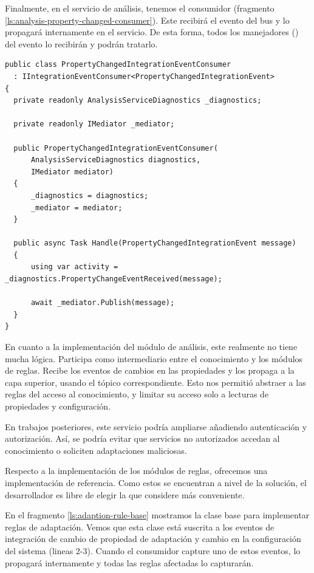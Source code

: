 Finalmente, en el servicio de análisis, tenemos el consumidor (fragmento \ref{ls:analysis-property-changed-consumer}). Este recibirá el evento del bus y lo propagará internamente en el servicio. De esta forma, todos los manejadores () del evento lo recibirán y podrán tratarlo.

\begin{lstlisting}[language={[Sharp]C},caption={El consumidor recibe el evento de integración del bus y lo propaga internamente. Todos los manejadores de este evento lo recibirán.},captionpos=b, label=ls:analysis-property-changed-consumer]
public class PropertyChangedIntegrationEventConsumer
  : IIntegrationEventConsumer<PropertyChangedIntegrationEvent>
{
  private readonly AnalysisServiceDiagnostics _diagnostics;

  private readonly IMediator _mediator;

  public PropertyChangedIntegrationEventConsumer(
      AnalysisServiceDiagnostics diagnostics,
      IMediator mediator)
  {
      _diagnostics = diagnostics;
      _mediator = mediator;
  }

  public async Task Handle(PropertyChangedIntegrationEvent message)
  {
      using var activity = _diagnostics.PropertyChangeEventReceived(message);

      await _mediator.Publish(message);
  }
}
\end{lstlisting}

En cuanto a la implementación del módulo de análisis, este realmente no tiene mucha lógica. Participa como intermediario entre el conocimiento y los módulos de reglas. Recibe los eventos de cambios en las propiedades y los propaga a la capa superior, usando el tópico correspondiente. Esto nos permitió abstraer a las reglas del acceso al conocimiento, y limitar su acceso solo a lecturas de propiedades y configuración.

En trabajos posteriores, este servicio podría ampliarse añadiendo autenticación y autorización. Así, se podría evitar que servicios no autorizados accedan al conocimiento o soliciten adaptaciones maliciosas.

Respecto a la implementación de los módulos de reglas, ofrecemos una implementación de referencia. Como estos se encuentran a nivel de la solución, el desarrollador es libre de elegir la que considere más conveniente.

En el fragmento \ref{ls:adaption-rule-base} mostramos la clase base para implementar reglas de adaptación. Vemos que esta clase está suscrita a los eventos de integración de cambio de propiedad de adaptación y cambio en la configuración del sistema (lineas 2-3). Cuando el consumidor capture uno de estos eventos, lo propagará internamente y todas las reglas afectadas lo capturarán.

